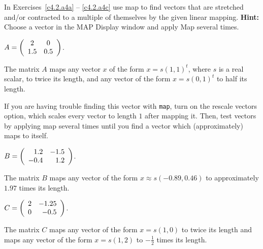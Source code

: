 \documentclass{ximera}
\begin{document}
\noindent In Exercises~\ref{c4.2.a4a} -- \ref{c4.2.a4c} use {\sf map} to
find vectors that are stretched and/or contracted to a multiple of
themselves by the given linear mapping.  {\bf Hint:}  Choose a vector in the
{\sf MAP Display} window and apply {\sf Map} several times.
\begin{exercise} \label{c4.2.a4a}
$A=\left(\begin{array}{cc} 2 & 0\\ 1.5 &0.5\end{array}\right)$.

\begin{solution}
The matrix $A$ maps any vector $x$ of the form
$x = s(1,1)^t$, where $s$ is a real scalar, to twice its length, and any
vector of the form $x = s(0,1)^t$ to half its length.

\para If you are having trouble finding this vector with {\tt map},
turn on the rescale vectors option, which scales every vector to length
$1$ after mapping it.  Then, test vectors by applying {\sf map} several
times until you find a vector which (approximately) maps to itself.


\end{solution}
\end{exercise}
\begin{exercise} \label{c4.2.a4b}
$B=\left(\begin{array}{rr} 1.2 & -1.5\\ -0.4 &1.2\end{array}\right)$.

\begin{solution}
The matrix $B$ maps any vector of the form
$x \approx s(-0.89,0.46)$ to approximately $1.97$ times its length.

\end{solution}
\end{exercise}
\begin{exercise} \label{c4.2.a4c}
$C=\left(\begin{array}{rr} 2 & -1.25\\ 0 &-0.5\end{array}\right)$.

\begin{solution}
The matrix $C$ maps any vector of the form $x = s(1,0)$
to twice its length and maps any vector of the form $x = s(1,2)$ to
$-\frac{1}{2}$ times its length.

\end{solution}
\end{exercise}
\end{document}
